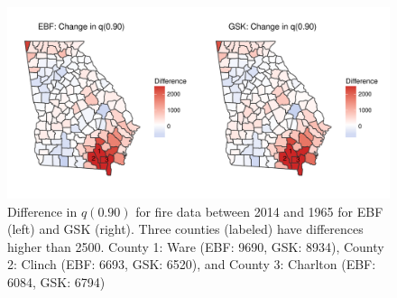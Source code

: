 \documentclass[11pt]{article}
\begin{document}
\begin{figure}[htbp]  %
  \centering
  \includegraphics[width=\linewidth]{plots/fire-q90diff-compare.pdf}
  \caption{Difference in $q(0.90)$ for fire data between 2014 and 1965 for EBF (left) and GSK (right). Three counties (labeled) have differences higher than 2500. County 1: Ware (EBF: 9690, GSK: 8934), County 2: Clinch (EBF: 6693, GSK: 6520), and County 3: Charlton (EBF: 6084, GSK: 6794)}
  \label{ebfig:fire-q90diff}
\end{figure}




\end{document}
